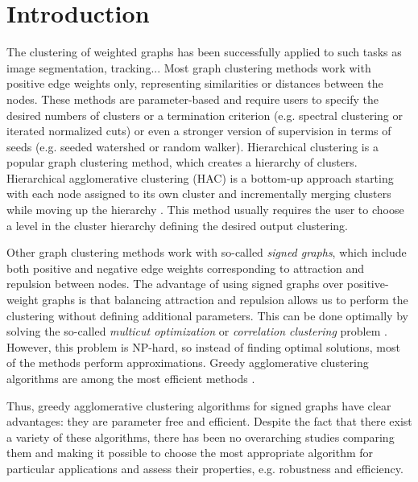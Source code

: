 
\section{Introduction}
The clustering of weighted graphs has been successfully applied to such tasks as image segmentation, tracking... 
Most graph clustering methods work with positive edge weights only, representing similarities or distances between the nodes. These methods are parameter-based and require users to specify the desired numbers of clusters or a termination criterion (e.g. spectral clustering or iterated normalized cuts) or even a stronger version of supervision in terms of seeds (e.g. seeded watershed or random walker).  
Hierarchical clustering is a popular graph clustering method, which creates a hierarchy of clusters. Hierarchical agglomerative clustering (HAC) is a bottom-up approach starting with each node assigned to its own cluster and incrementally merging clusters while moving up the hierarchy \cite{lance1967general}. This method usually requires the user to choose a level in the cluster hierarchy defining the desired output clustering. 

Other graph clustering methods work with so-called \emph{signed graphs}, which include both positive and negative edge weights corresponding to attraction and repulsion between nodes. The advantage of using signed graphs over positive-weight graphs is that balancing attraction and repulsion allows us to perform the clustering without defining additional parameters. This can be done optimally by solving the so-called \emph{multicut optimization} or \emph{correlation clustering} problem \cite{kappes2011globally,chopra1991multiway}. However, this problem is NP-hard, so instead of finding optimal solutions, most of the methods perform approximations. Greedy agglomerative clustering algorithms are among the most efficient methods \cite{keuper2015efficient,levinkov2017comparative,wolf2018mutex,kardoostsolving}. 

Thus, greedy agglomerative clustering algorithms for signed graphs have clear advantages: they are parameter free and efficient. Despite the fact that there exist a variety of these algorithms, there has been no overarching studies comparing them and making it possible to choose the most appropriate algorithm for particular applications and assess their properties, e.g. robustness and efficiency.


